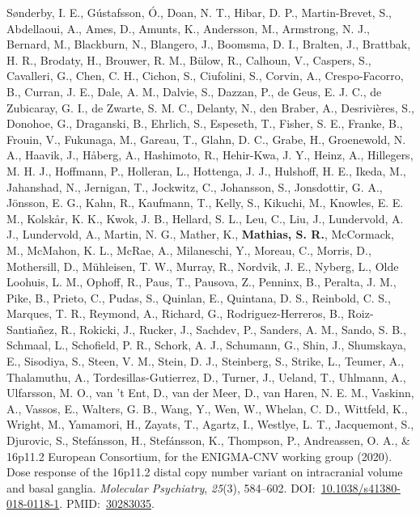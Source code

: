 \documentclass[10pt]{article}
\makeatletter
\newlength{\bibhang}
\newlength{\bibsep}
 {\@listi \global\bibsep\itemsep \global\advance\bibsep by\parsep}
\newenvironment{bibsection}%
        {\vspace{-\baselineskip}\begin{list}{}{%
       \setlength{\leftmargin}{\bibhang}%
       \setlength{\itemindent}{-\leftmargin}%
       \setlength{\itemsep}{\bibsep}%
       \setlength{\parsep}{\z@}%
        \setlength{\partopsep}{0pt}%
        \setlength{\topsep}{0pt}}}
        {\end{list}\vspace{-.6\baselineskip}}
\makeatother
\begin{document}
\begin{bibsection}
\item Sønderby, I. E., Gústafsson, Ó., Doan, N. T., Hibar, D. P., Martin-Brevet, S., Abdellaoui, A., Ames, D., Amunts, K., Andersson, M., Armstrong, N. J., Bernard, M., Blackburn, N., Blangero, J., Boomsma, D. I., Bralten, J., Brattbak, H. R., Brodaty, H., Brouwer, R. M., Bülow, R., Calhoun, V., Caspers, S., Cavalleri, G., Chen, C. H., Cichon, S., Ciufolini, S., Corvin, A., Crespo-Facorro, B., Curran, J. E., Dale, A. M., Dalvie, S., Dazzan, P., de Geus, E. J. C., de Zubicaray, G. I., de Zwarte, S. M. C., Delanty, N., den Braber, A., Desrivières, S., Donohoe, G., Draganski, B., Ehrlich, S., Espeseth, T., Fisher, S. E., Franke, B., Frouin, V., Fukunaga, M., Gareau, T., Glahn, D. C., Grabe, H., Groenewold, N. A., Haavik, J., Håberg, A., Hashimoto, R., Hehir-Kwa, J. Y., Heinz, A., Hillegers, M. H. J., Hoffmann, P., Holleran, L., Hottenga, J. J., Hulshoff, H. E., Ikeda, M., Jahanshad, N., Jernigan, T., Jockwitz, C., Johansson, S., Jonsdottir, G. A., Jönsson, E. G., Kahn, R., Kaufmann, T., Kelly, S., Kikuchi, M., Knowles, E. E. M., Kolskår, K. K., Kwok, J. B., Hellard, S. L., Leu, C., Liu, J., Lundervold, A. J., Lundervold, A., Martin, N. G., Mather, K., \textbf{Mathias, S. R.}, McCormack, M., McMahon, K. L., McRae, A., Milaneschi, Y., Moreau, C., Morris, D., Mothersill, D., Mühleisen, T. W., Murray, R., Nordvik, J. E., Nyberg, L., Olde Loohuis, L. M., Ophoff, R., Paus, T., Pausova, Z., Penninx, B., Peralta, J. M., Pike, B., Prieto, C., Pudas, S., Quinlan, E., Quintana, D. S., Reinbold, C. S., Marques, T. R., Reymond, A., Richard, G., Rodriguez-Herreros, B., Roiz-Santiañez, R., Rokicki, J., Rucker, J., Sachdev, P., Sanders, A. M., Sando, S. B., Schmaal, L., Schofield, P. R., Schork, A. J., Schumann, G., Shin, J., Shumskaya, E., Sisodiya, S., Steen, V. M., Stein, D. J., Steinberg, S., Strike, L., Teumer, A., Thalamuthu, A., Tordesillas-Gutierrez, D., Turner, J., Ueland, T., Uhlmann, A., Ulfarsson, M. O., van 't Ent, D., van der Meer, D., van Haren, N. E. M., Vaskinn, A., Vassos, E., Walters, G. B., Wang, Y., Wen, W., Whelan, C. D., Wittfeld, K., Wright, M., Yamamori, H., Zayats, T., Agartz, I., Westlye, L. T., Jacquemont, S., Djurovic, S., Stefánsson, H., Stefánsson, K., Thompson, P., Andreassen, O. A., \& 16p11.2 European Consortium, for the ENIGMA-CNV working group (2020). Dose response of the 16p11.2 distal copy number variant on intracranial volume and basal ganglia. \emph{Molecular Psychiatry}, \emph{25}(3), 584--602. DOI:~\href{https://doi.org/10.1038/s41380-018-0118-1}{10.1038/s41380-018-0118-1}. PMID:~\href{https://www.ncbi.nlm.nih.gov/pubmed/?term=30283035}{30283035}.


\end{bibsection}
\end{document}
